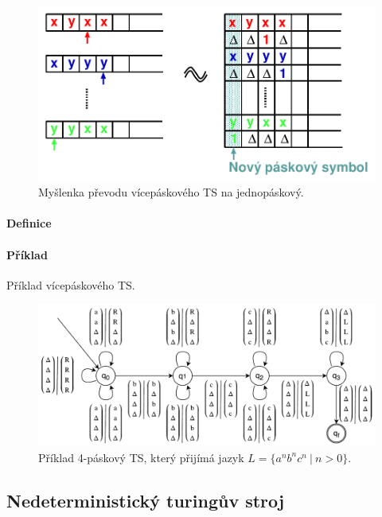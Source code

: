 \begin{figure}[H]
    \centering
    \includegraphics[width=1\linewidth]{ts_vicepaskovy_dukaz.pdf}
    \caption{Myšlenka převodu vícepáskového TS na jednopáskový.}
\end{figure}

\paragraph*{Definice} 

\paragraph*{Příklad} Příklad vícepáskového TS.

\begin{figure}[H]
    \centering
    \includegraphics[width=1\linewidth]{ts_vicepaskovy_example.pdf}
    \caption{Příklad 4-páskový TS, který přijímá jazyk $L = \{ a^n b^n c^n ~|~ n > 0 \}$.}
\end{figure}

\subsection{Nedeterministický turingův stroj}


